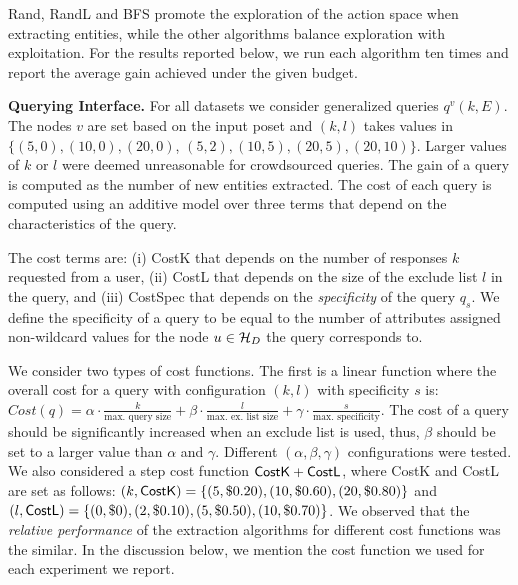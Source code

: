 Rand, RandL and BFS promote the exploration of the action space when extracting entities, while the other algorithms balance exploration with exploitation. For the results reported below, we run each algorithm ten times and report the average gain achieved under the given budget.

\noindent\textbf{Querying Interface.} For all datasets we consider generalized queries $q^v(k,E)$. The nodes $v$ are set based on the input poset and $(k,l)$ takes values in {\small $\{(5,0), (10,0), (20,0)$, $(5,2), (10,5), (20,5), (20,10)\}$}. Larger values of $k$ or $l$ were deemed unreasonable for crowdsourced queries. The gain of a query is computed as the number of new entities extracted. The cost of each query is computed using an additive model over three terms that depend on the characteristics of the query. 

The cost terms are: (i) {\sf CostK} that depends on the number of responses $k$ requested from a user, (ii) {\sf CostL} that depends on the size of the exclude list $l$ in the query, and (iii) {\sf CostSpec} that depends on the {\em specificity} of the query $q_s$. We define the specificity of a query to be equal to the number of attributes assigned non-wildcard values for the node $u \in \mathcal{H}_D$ the query corresponds to. 

We consider two types of cost functions. The first is a linear function where the overall cost for a query with configuration $(k,l)$ with specificity $s$ is:{\scriptsize $Cost(q) = \alpha \cdot \frac{k}{\mbox{max. query size}} + \beta \cdot  \frac{l}{\mbox{max. ex. list size}} + \gamma \cdot  \frac{s}{\mbox{max. specificity}} $}. The cost of a query should be significantly increased when an exclude list is used, thus, $\beta$ should be set to a larger value than $\alpha$ and $\gamma$. Different $(\alpha, \beta, \gamma)$ configurations were tested. We also considered a step cost function ${\sf CostK} + {\sf CostL}$, where {\sf CostK} and {\sf CostL} are set as follows: $(k,{\sf CostK}) = \{(5,\$0.20), (10,\$0.60), (20,\$0.80)\}$ and $(l,{\sf CostL}) = \{(0,\$0), (2,\$0.10), (5,\$0.50), (10,\$0.70)\}$. We observed that the {\em relative performance} of the extraction algorithms for different cost functions was the similar. In the discussion below, we mention the cost function we used for each experiment we report. 

